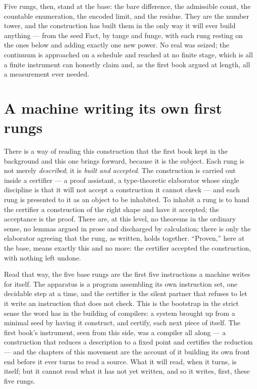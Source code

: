 Five rungs, then, stand at the base: the bare difference, the admissible count, the countable enumeration,
the encoded limit, and the residue. They are the number tower, and the construction has built them in the
only way it will ever build anything --- from the seed Fact, by tange and funge, with each rung resting on
the ones below and adding exactly one new power. No real was seized; the continuum is approached on a
schedule and reached at no finite stage, which is all a finite instrument can honestly claim and, as the
first book argued at length, all a measurement ever needed.

\section{A machine writing its own first rungs}
\label{se:machine-first-rungs}

There is a way of reading this construction that the first book kept in the background and this one brings
forward, because it is the subject. Each rung is not merely \emph{described}; it is \emph{built and
accepted}. The construction is carried out inside a certifier --- a proof assistant, a type-theoretic
elaborator whose single discipline is that it will not accept a construction it cannot check --- and each
rung is presented to it as an object to be inhabited. To inhabit a rung is to hand the certifier a
construction of the right shape and have it accepted; the acceptance is the proof. There are, at this
level, no theorems in the ordinary sense, no lemmas argued in prose and discharged by calculation; there is
only the elaborator agreeing that the rung, as written, holds together. ``Proven,'' here at the base,
means exactly this and no more: the certifier accepted the construction, with nothing left undone.

Read that way, the five base rungs are the first five instructions a machine writes for itself. The
apparatus is a program assembling its own instruction set, one decidable step at a time, and the certifier
is the silent partner that refuses to let it write an instruction that does not check. This is the
bootstrap in the strict sense the word has in the building of compilers: a system brought up from a minimal
seed by having it construct, and certify, each next piece of itself. The first book's instrument, seen from
this side, was a compiler all along --- a construction that reduces a description to a fixed point and
certifies the reduction --- and the chapters of this movement are the account of it building its own front
end before it ever turns to read a source. What it will read, when it turns, is itself; but it cannot read
what it has not yet written, and so it writes, first, these five rungs.

